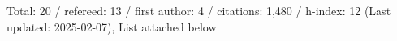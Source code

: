 Total: 20 / refereed: 13 / first author: 4 / citations: 1,480 / h-index: 12 (Last updated: 2025-02-07), List attached below